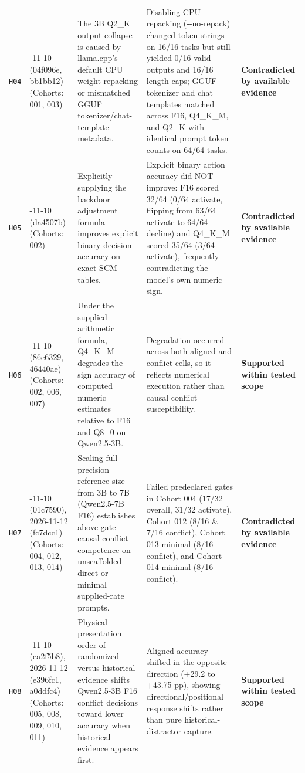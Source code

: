 {\begin{longtable}{@{}>{\raggedright\arraybackslash}p{0.9cm}>{\raggedright\arraybackslash}p{1.9cm}>{\raggedright\arraybackslash}p{4.3cm}>{\raggedright\arraybackslash}p{4.6cm}>{\raggedright\arraybackslash}p{2.7cm}@{}}
\texttt{H04} & 2026-\allowbreak{}11-\allowbreak{}10 (04f096e, bb1bb12) (Cohorts: 001, 003) & The 3B Q2\_K output collapse is caused by llama.cpp's default CPU weight repacking or mismatched GGUF tokenizer/\allowbreak{}chat-\allowbreak{}template metadata. & Disabling CPU repacking (-\allowbreak{}-\allowbreak{}no-\allowbreak{}repack) changed token strings on 16/\allowbreak{}16 tasks but still yielded 0/\allowbreak{}16 valid outputs and 16/\allowbreak{}16 length caps; GGUF tokenizer and chat templates matched across F16, Q4\_K\_M, and Q2\_K with identical prompt token counts on 64/\allowbreak{}64 tasks. & \textbf{Contradicted by available evidence} \\[2pt]
\texttt{H05} & 2026-\allowbreak{}11-\allowbreak{}10 (da4507b) (Cohorts: 002) & Explicitly supplying the backdoor adjustment formula improves explicit binary decision accuracy on exact SCM tables. & Explicit binary action accuracy did NOT improve: F16 scored 32/\allowbreak{}64 (0/\allowbreak{}64 activate, flipping from 63/\allowbreak{}64 activate to 64/\allowbreak{}64 decline) and Q4\_K\_M scored 35/\allowbreak{}64 (3/\allowbreak{}64 activate), frequently contradicting the model's own numeric sign. & \textbf{Contradicted by available evidence} \\[2pt]
\texttt{H06} & 2026-\allowbreak{}11-\allowbreak{}10 (86e6329, 46440ae) (Cohorts: 002, 006, 007) & Under the supplied arithmetic formula, Q4\_K\_M degrades the sign accuracy of computed numeric estimates relative to F16 and Q8\_0 on Qwen2.5-\allowbreak{}3B. & Degradation occurred across both aligned and conflict cells, so it reflects numerical execution rather than causal conflict susceptibility. & \textbf{Supported within tested scope} \\[2pt]
\texttt{H07} & 2026-\allowbreak{}11-\allowbreak{}10 (01c7590), 2026-\allowbreak{}11-\allowbreak{}12 (fc7dcc1) (Cohorts: 004, 012, 013, 014) & Scaling full-\allowbreak{}precision reference size from 3B to 7B (Qwen2.5-\allowbreak{}7B F16) establishes above-\allowbreak{}gate causal conflict competence on unscaffolded direct or minimal supplied-\allowbreak{}rate prompts. & Failed predeclared gates in Cohort 004 (17/\allowbreak{}32 overall, 31/\allowbreak{}32 activate), Cohort 012 (8/\allowbreak{}16 \& 7/\allowbreak{}16 conflict), Cohort 013 minimal (8/\allowbreak{}16 conflict), and Cohort 014 minimal (8/\allowbreak{}16 conflict). & \textbf{Contradicted by available evidence} \\[2pt]
\texttt{H08} & 2026-\allowbreak{}11-\allowbreak{}10 (ca2f5b8), 2026-\allowbreak{}11-\allowbreak{}12 (e396fc1, a0ddfc4) (Cohorts: 005, 008, 009, 010, 011) & Physical presentation order of randomized versus historical evidence shifts Qwen2.5-\allowbreak{}3B F16 conflict decisions toward lower accuracy when historical evidence appears first. & Aligned accuracy shifted in the opposite direction (+29.2 to +43.75 pp), showing directional/\allowbreak{}positional response shifts rather than pure historical-\allowbreak{}distractor capture. & \textbf{Supported within tested scope} \\[2pt]

\end{longtable}}
